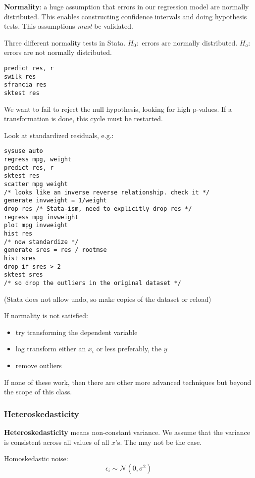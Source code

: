 \documentclass[11pt, oneside]{article}   	%
\begin{document}
\textbf{Normality}: a huge assumption that errors in our regression model are normally distributed. This enables constructing confidence intervals and doing hypothesis tests. This assumptions \textit{must} be validated.

Three different normality tests in Stata. $H_0:$ errors are normally distributed. $H_a:$ errors are not normally distributed.
\begin{verbatim}
predict res, r
swilk res
sfrancia res
sktest res
\end{verbatim}

We want to fail to reject the null hypothesis, looking for high p-values. If a transformation is done, this cycle must be restarted.

Look at standardized residuals, e.g.:
\begin{verbatim}
sysuse auto
regress mpg, weight
predict res, r
sktest res
scatter mpg weight
/* looks like an inverse reverse relationship. check it */
generate invweight = 1/weight
drop res /* Stata-ism, need to explicitly drop res */
regress mpg invweight
plot mpg invweight
hist res
/* now standardize */
generate sres = res / rootmse
hist sres
drop if sres > 2
sktest sres
/* so drop the outliers in the original dataset */
\end{verbatim}

(Stata does not allow undo, so make copies of the dataset or reload)

If normality is not satisfied:
\begin{itemize}
\item{try transforming the dependent variable}
\item{log transform either an $x_i$ or less preferably, the $y$}
\item{remove outliers}
\end{itemize}

If none of these work, then there are other more advanced techniques but beyond the scope of this class.

\subsubsection{Heteroskedasticity}

\textbf{Heteroskedasticity} means non-constant variance. We assume that the variance is consistent across all values of all $x$'s. The may not be the case.

Homoskedastic noise:
\[
\epsilon_i \sim \mathcal{N}(0,\sigma^2)
\]
\end{document}
